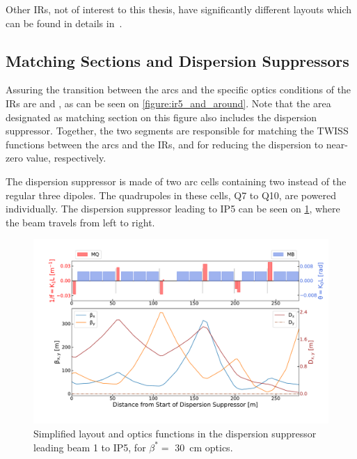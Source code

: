 Other IRs, not of interest to this thesis, have significantly different layouts which can be found in details in~\cite{BOOK:Bruning:LHC_Design_Report_Main_Ring,PHD:Vanbavinckhove}.

\subsection{Matching Sections and Dispersion Suppressors}
\label{subsection:matching_sections_dispersion_suppressors}

Assuring the transition between the arcs and the specific optics conditions of the IRs are  and , as can be seen on \cref{figure:ir5_and_around}.
Note that the area designated as matching section on this figure also includes the dispersion suppressor.
Together, the two segments are responsible for matching the TWISS functions between the arcs and the IRs, and for reducing the dispersion to near-zero value, respectively.

The dispersion suppressor is made of two arc cells containing two instead of the regular three dipoles.
The quadrupoles in these cells, Q\num{7} to Q\num{10}, are powered individually.
The dispersion suppressor leading to IP\num{5} can be seen on \cref{figure:lhc_dispersion_suppressor}, where the beam travels from left to right.

\begin{figure}[!hbt]
  \centering
  \includegraphics*[width=0.99\linewidth]{Figures/Optics_Measurements_Corrections_at_LHC/lhc_dispersion_suppressor.pdf}
  \caption{Simplified layout and optics functions in the dispersion suppressor leading beam \num{1} to IP\num{5}, for \(\beta^{\ast} =\) \qty{30}{\centi\meter} optics.}
  \label{figure:lhc_dispersion_suppressor}
\end{figure}

